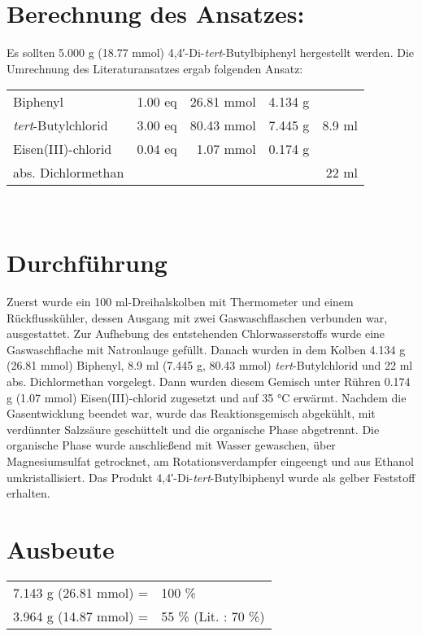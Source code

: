 \documentclass[12pt]{article}
\begin{document}
\begin{onehalfspace}
\section{Berechnung des Ansatzes: } 
Es sollten 5.000 g (18.77 mmol) 4,4′-Di-\textit{tert}-Butylbiphenyl hergestellt werden. Die Umrechnung des Literaturansatzes \cite{organikum} ergab folgenden Ansatz:\\[0.5cm]
\begin{tabular}{lrrrr}
Biphenyl & 1.00 eq  & 26.81 mmol & 4.134 g & \\
\textit{tert}-Butylchlorid & 3.00 eq &  80.43 mmol & 7.445 g & 8.9 ml\\
Eisen(III)-chlorid  & 0.04 eq  & 1.07 mmol & 0.174 g & \\
abs. Dichlormethan & & & & 22 ml \\
\end{tabular}\\[0.5cm]
\normalsize \section{Durchführung \cite{organikum}} 
Zuerst wurde ein 100 ml-Dreihalskolben mit Thermometer und einem Rückflusskühler, dessen Ausgang mit zwei Gaswaschflaschen verbunden war, ausgestattet. Zur Aufhebung des entstehenden Chlorwasserstoffs wurde eine Gaswaschflache mit Natronlauge gefüllt. Danach wurden in dem Kolben 4.134 g (26.81 mmol) Biphenyl, 8.9 ml (7.445 g, 80.43 mmol) \textit{tert}-Butylchlorid und 22 ml abs. Dichlormethan vorgelegt. Dann wurden diesem Gemisch unter Rühren 0.174 g (1.07 mmol) Eisen(III)-chlorid zugesetzt und auf 35 \si{\celsius} erwärmt. Nachdem die Gasentwicklung beendet war, wurde das Reaktionsgemisch abgekühlt, mit verdünnter Salzsäure geschüttelt und die organische Phase abgetrennt. Die organische Phase wurde anschließend mit Wasser gewaschen, über Magnesiumsulfat getrocknet, am Rotationsverdampfer eingeengt und aus Ethanol umkristallisiert. Das Produkt 4,4′-Di-\textit{tert}-Butylbiphenyl wurde als gelber Feststoff erhalten.
\section{Ausbeute} 
\begin{tabular}{ rl}
  7.143 g (26.81 mmol) =  & 100 \%\\
  3.964 g (14.87 mmol) =  &  55 \% (Lit.\cite{organikum} : 70 \%) \\
 \end{tabular}

\end{onehalfspace}
\end{document}
